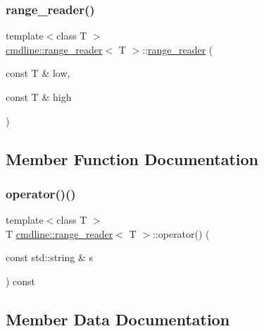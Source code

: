 \subsubsection{\texorpdfstring{range\_reader()}{range\_reader()}}
{\footnotesize\ttfamily template$<$class T $>$ \\
\mbox{\hyperlink{structcmdline_1_1range__reader}{cmdline\+::range\+\_\+reader}}$<$ T $>$\+::\mbox{\hyperlink{structcmdline_1_1range__reader}{range\+\_\+reader}} (\begin{DoxyParamCaption}\item[{const T \&}]{low,  }\item[{const T \&}]{high }\end{DoxyParamCaption})\hspace{0.3cm}{\ttfamily [inline]}}



\subsection{Member Function Documentation}
\mbox{\label{structcmdline_1_1range__reader_a81dfb7277756d5b23f816481db121a20}} 
\subsubsection{\texorpdfstring{operator()()}{operator()()}}
{\footnotesize\ttfamily template$<$class T $>$ \\
T \mbox{\hyperlink{structcmdline_1_1range__reader}{cmdline\+::range\+\_\+reader}}$<$ T $>$\+::operator() (\begin{DoxyParamCaption}\item[{const std\+::string \&}]{s }\end{DoxyParamCaption}) const\hspace{0.3cm}{\ttfamily [inline]}}



\subsection{Member Data Documentation}
\mbox{\label{structcmdline_1_1range__reader_ad1ef134b223c59257fff990b99c54ee4}} 
